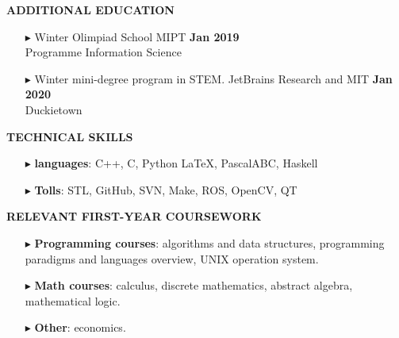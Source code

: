 \documentclass[a4paper,10pt]{article}
\begin{document}
	\colorbox{magicmint}{
		\begin{minipage}{0.96\textwidth}
			\textbf{ADDITIONAL EDUCATION}
		\end{minipage}
	}
	
	\begin{itemize}
		\item[$\blacktriangleright$]  Winter Olimpiad School MIPT \hspace{10.4cm}\textbf{Jan 2019} \\ Programme Information Science 
		\item[$\blacktriangleright$]  Winter mini-degree program in STEM. JetBrains Research and MIT \hspace{4.7cm}\textbf{Jan 2020} \\ Duckietown
	\end{itemize}
	
	\colorbox{magicmint}{
		\begin{minipage}{0.96\textwidth}
			\textbf{TECHNICAL SKILLS}
		\end{minipage}
	}
	\begin{itemize}
		\item [$\blacktriangleright$]  \textbf{languages}: C++, C, Python \LaTeX, PascalABC, Haskell
		\item [$\blacktriangleright$]  \textbf{Tolls}: STL, GitHub, SVN, Make, ROS, OpenCV, QT
	\end{itemize}
	
	\colorbox{magicmint}{
		\begin{minipage}{0.96\textwidth}
			\textbf{RELEVANT FIRST-YEAR COURSEWORK}
		\end{minipage}
	}
	\begin{itemize}
		\item [$\blacktriangleright$]{
			\textbf{Programming courses}{: algorithms and data structures, programming paradigms and languages overview, UNIX operation system.}
		}
		\item [$\blacktriangleright$] {
			\textbf{Math courses}{: calculus, discrete mathematics, abstract algebra, mathematical logic.}
		}
		\item [$\blacktriangleright$] {
			\textbf{Other}{: economics.}
		}
	\end{itemize}
\end{document}
